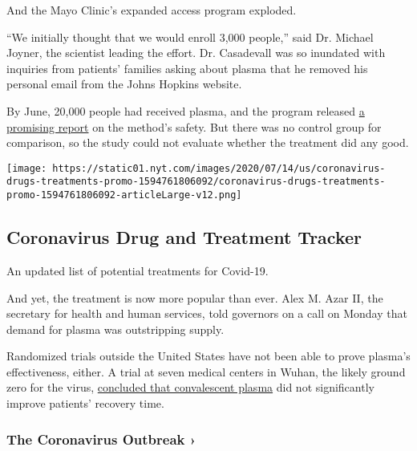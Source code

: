 And the Mayo Clinic's expanded access program exploded.

``We initially thought that we would enroll 3,000 people,'' said Dr.
Michael Joyner, the scientist leading the effort. Dr. Casadevall was so
inundated with inquiries from patients' families asking about plasma
that he removed his personal email from the Johns Hopkins website.

By June, 20,000 people had received plasma, and the program released
\href{https://els-jbs-prod-cdn.jbs.elsevierhealth.com/pb/assets/raw/Health\%20Advance/journals/jmcp/jmcp_ft95_6_8.pdf}{a
promising report} on the method's safety. But there was no control group
for comparison, so the study could not evaluate whether the treatment
did any good.

\href{https://www.nytimes.com/interactive/2020/science/coronavirus-drugs-treatments.html}{}

\texttt{[image: https://static01.nyt.com/images/2020/07/14/us/coronavirus-drugs-treatments-promo-1594761806092/coronavirus-drugs-treatments-promo-1594761806092-articleLarge-v12.png]}

\hypertarget{coronavirus-drug-and-treatment-tracker}{%
\subsection{Coronavirus Drug and Treatment
Tracker}\label{coronavirus-drug-and-treatment-tracker}}

An updated list of potential treatments for Covid-19.

And yet, the treatment is now more popular than ever. Alex M. Azar II,
the secretary for health and human services, told governors on a call on
Monday that demand for plasma was outstripping supply.

Randomized trials outside the United States have not been able to prove
plasma's effectiveness, either. A trial at seven medical centers in
Wuhan, the likely ground zero for the virus,
\href{https://jamanetwork.com/journals/jama/article-abstract/2766943}{concluded
that convalescent plasma} did not significantly improve patients'
recovery time.

\href{https://www.nytimes.com/news-event/coronavirus?action=click\&pgtype=Article\&state=default\&region=MAIN_CONTENT_3\&context=storylines_faq}{}

\hypertarget{the-coronavirus-outbreak-}{%
\subsubsection{The Coronavirus Outbreak
›}\label{the-coronavirus-outbreak-}}

